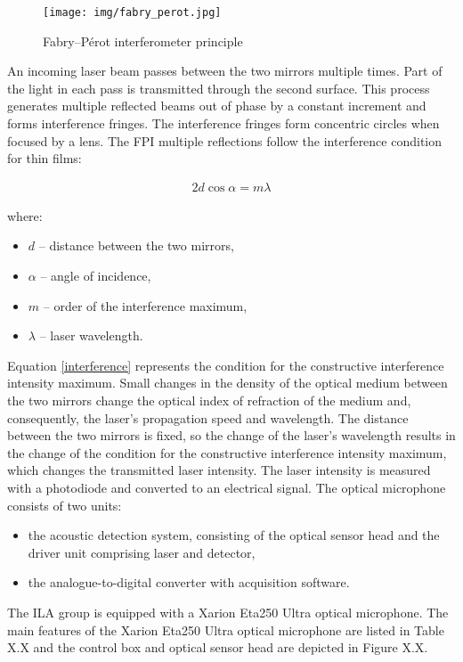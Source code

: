 \begin{figure}[h]
    \centering
    \texttt{[image: img/fabry\_perot.jpg]}
    \caption{Fabry–Pérot interferometer principle}
    \label{fig:fabry_perot}
\end{figure}


An incoming laser beam passes between the two mirrors multiple times. Part of the light in each pass is transmitted through the second surface. This process generates multiple reflected beams out of phase by a constant increment and forms interference fringes. The interference fringes form concentric circles when focused by a lens. The FPI multiple reflections follow the interference condition for thin films:

\begin{gather} \label{interference}
2d\cos\alpha = m\lambda
\end{gather} 

where:

\begin{itemize}

    \item $d$ -- distance between the two mirrors,
    \item $\alpha$ -- angle of incidence,
    \item $m$ -- order of the interference maximum,
    \item $\lambda$ -- laser wavelength.
    
\end{itemize}


Equation \ref{interference} represents the condition for the constructive interference intensity maximum.
 Small changes in the density of the optical medium between the two mirrors change the optical index of refraction of the medium and, consequently, the laser’s propagation speed and wavelength. The distance between the two mirrors is fixed, so the change of the laser’s wavelength results in the change of the condition for the constructive interference intensity maximum, which changes the transmitted laser intensity. The laser intensity is measured with a photodiode and converted to an electrical signal. The optical microphone consists of two units:
 
\begin{itemize}
 
    \item the acoustic detection system, consisting of the optical sensor head and the driver unit comprising laser and detector,

    \item the analogue-to-digital converter with acquisition software.

\end{itemize}

The ILA group is equipped with a Xarion Eta250 Ultra optical microphone. The main features of the Xarion Eta250 Ultra optical microphone are listed in Table X.X and the control box and optical sensor head are depicted in Figure X.X. 




